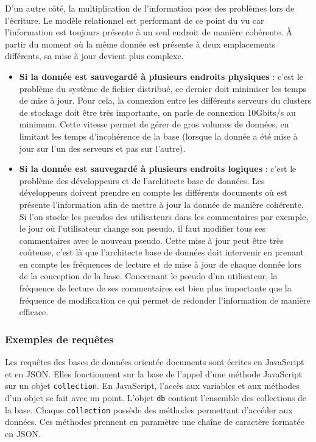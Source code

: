   D'un autre côté, la multiplication de l'information pose des problèmes lors de l'écriture. Le modèle relationnel est performant de ce point du vu car l'information est toujours présente à un seul endroit de manière cohérente. À partir du moment où la même donnée est présente à deux emplacements différents, sa mise à jour devient plus complexe.\\

  \begin{itemize}
    \item \textbf{Si la donnée est sauvegardé à plusieurs endroits physiques} : c'est le problème du système de fichier distribué, ce dernier doit minimiser les temps de mise à jour. Pour cela, la connexion entre les différents serveurs du clusters de stockage doit être très importante, on parle de connexion 10Gbits/s au minimum. Cette vitesse permet de gérer de gros volumes de données, en limitant les temps d'incohérence de la base (lorsque la donnée a été mise à jour sur l'un des serveurs et pas sur l'autre).
    \item \textbf{Si la donnée est sauvegardé à plusieurs endroits logiques} : c'est le problème des développeurs et de l'architecte base de données. Les développeurs doivent prendre en compte les différents documents où est présente l'information afin de mettre à jour la donnée de manière cohérente. Si l'on stocke les pseudos des utilisateurs dans les commentaires par exemple, le jour où l'utilisateur change son pseudo, il faut modifier tous ses commentaires avec le nouveau pseudo. Cette mise à jour peut être très coûteuse, c'est là que l'architecte base de données doit intervenir en prenant en compte les fréquences de lecture et de mise à jour de chaque donnée lors de la conception de la base. Concernant le pseudo d'un utilisateur, la fréquence de lecture de ses commentaires est bien plus importante que la fréquence de modification ce qui permet de redonder l'information de manière efficace.
  \end{itemize}

\subsubsection{Exemples de requêtes}

  Les requêtes des bases de données orientée documents sont écrites en JavaScript et en JSON. Elles fonctionnent sur la base de l'appel d'une méthode JavaScript sur un objet \verb|collection|. En JavaScript, l'accès aux variables et aux méthodes d'un objet se fait avec un point. L'objet \verb|db| contient l'ensemble des collections de la base. Chaque \verb|collection| possède des méthodes permettant d'accéder aux données. Ces méthodes prennent en paramètre une chaîne de caractère formatée en JSON. 

